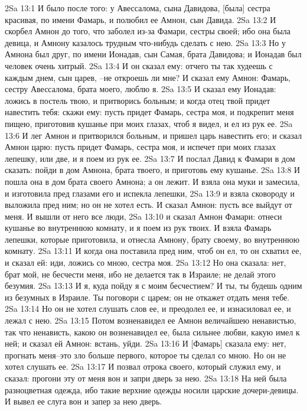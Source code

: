 2Sa 13:1  И было после того: у Авессалома, сына Давидова, [была] сестра красивая, по имени Фамарь, и полюбил ее Амнон, сын Давида.
2Sa 13:2  И скорбел Амнон до того, что заболел из-за Фамари, сестры своей; ибо она была девица, и Амнону казалось трудным что-нибудь сделать с нею.
2Sa 13:3  Но у Амнона был друг, по имени Ионадав, сын Самая, брата Давидова; и Ионадав был человек очень хитрый.
2Sa 13:4  И он сказал ему: отчего ты так худеешь с каждым днем, сын царев, --не откроешь ли мне? И сказал ему Амнон: Фамарь, сестру Авессалома, брата моего, люблю я.
2Sa 13:5  И сказал ему Ионадав: ложись в постель твою, и притворись больным; и когда отец твой придет навестить тебя: скажи ему: пусть придет Фамарь, сестра моя, и подкрепит меня пищею, приготовив кушанье при моих глазах, чтоб я видел, и ел из рук ее.
2Sa 13:6  И лег Амнон и притворился больным, и пришел царь навестить его; и сказал Амнон царю: пусть придет Фамарь, сестра моя, и испечет при моих глазах лепешку, или две, и я поем из рук ее.
2Sa 13:7  И послал Давид к Фамари в дом сказать: пойди в дом Амнона, брата твоего, и приготовь ему кушанье.
2Sa 13:8  И пошла она в дом брата своего Амнона; а он лежит. И взяла она муки и замесила, и изготовила пред глазами его и испекла лепешки,
2Sa 13:9  и взяла сковороду и выложила пред ним; но он не хотел есть. И сказал Амнон: пусть все выйдут от меня. И вышли от него все люди,
2Sa 13:10  и сказал Амнон Фамари: отнеси кушанье во внутреннюю комнату, и я поем из рук твоих. И взяла Фамарь лепешки, которые приготовила, и отнесла Амнону, брату своему, во внутреннюю комнату.
2Sa 13:11  И когда она поставила пред ним, чтоб он ел, то он схватил ее, и сказал ей: иди, ложись со мною, сестра моя.
2Sa 13:12  Но она сказала: нет, брат мой, не бесчести меня, ибо не делается так в Израиле; не делай этого безумия.
2Sa 13:13  И я, куда пойду я с моим бесчестием? И ты, ты будешь одним из безумных в Израиле. Ты поговори с царем; он не откажет отдать меня тебе.
2Sa 13:14  Но он не хотел слушать слов ее, и преодолел ее, и изнасиловал ее, и лежал с нею.
2Sa 13:15  Потом возненавидел ее Амнон величайшею ненавистью, так что ненависть, какою он возненавидел ее, была сильнее любви, какую имел к ней; и сказал ей Амнон: встань, уйди.
2Sa 13:16  И [Фамарь] сказала ему: нет, прогнать меня--это зло больше первого, которое ты сделал со мною. Но он не хотел слушать ее.
2Sa 13:17  И позвал отрока своего, который служил ему, и сказал: прогони эту от меня вон и запри дверь за нею.
2Sa 13:18  На ней была разноцветная одежда, ибо такие верхние одежды носили царские дочери-девицы. И вывел ее слуга вон и запер за нею дверь.

